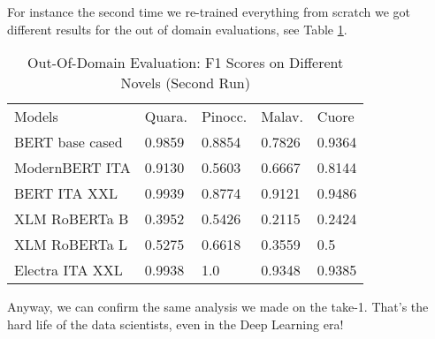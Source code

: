 \documentclass[11pt]{article}
\begin{document}
For instance the second time we re-trained everything from scratch we got different results
for the out of domain evaluations, see Table \ref{t4}.

\begin{table}[]
	\small
	\caption{Out-Of-Domain Evaluation: F1 Scores on Different Novels (Second Run)}
	\begin{tabular}{lllll}
		Models & Quara. & Pinocc. & Malav. & Cuore \\
		BERT base cased & 0.9859      & 0.8854 & 0.7826        & 0.9364                 \\
		ModernBERT ITA  & 0.9130     & 0.5603   & 0.6667   & 0.8144                 \\
		BERT ITA XXL  & 0.9939     & 0.8774  & 0.9121     & 0.9486                 \\
		XLM RoBERTa B & 0.3952      & 0.5426   & 0.2115     & 0.2424                 \\
		XLM RoBERTa L & 0.5275       & 0.6618    & 0.3559   & 0.5               \\
		Electra ITA XXL  & 0.9938      & 1.0   & 0.9348    & 0.9385            
	\end{tabular}
	\label{t4}
\end{table}

Anyway, we can confirm the same analysis we made on the take-1.
That's the hard life of the data scientists, even in the Deep Learning era!


\end{document}
